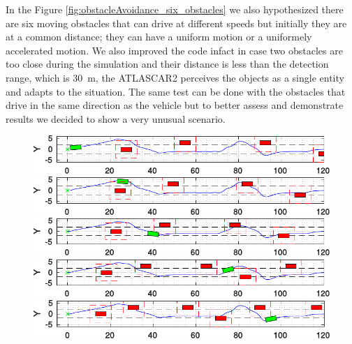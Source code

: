 In the Figure \ref{fig:obstacleAvoidance_six_obstacles} we also hypothesized there are six moving obstacles that can drive at different speeds but initially they are at a common distance; they can have a uniform motion or a uniformely accelerated motion. We also improved the code infact in case two obstacles are too close during the simulation and their distance is less than the detection range, which is \SI{30}{m}, the ATLASCAR2 perceives the objects as a single entity and adapts to the situation. The same test can be done with the obstacles that drive in the same direction as the vehicle but to better assess and demonstrate results we decided to show a very unusual scenario. 
\begin{figure}[h!]
	\centering
	\begin{minipage}[t]{\textwidth}
		\includegraphics[width=\textwidth]{../figure/6_obstacles/6_obstacles_1.pdf}
	\end{minipage}
	\begin{minipage}[t]{\textwidth}
		\includegraphics[width=\textwidth]{../figure/6_obstacles/6_obstacles_2.pdf}
	\end{minipage}
	\begin{minipage}[t]{\textwidth}
		\includegraphics[width=\textwidth]{../figure/6_obstacles/6_obstacles_3.pdf}
	\end{minipage}
	\begin{minipage}[t]{\textwidth}
		\includegraphics[width=\textwidth]{../figure/6_obstacles/6_obstacles_4.pdf}
	\end{minipage}
	\begin{minipage}[t]{\textwidth}
		\includegraphics[width=\textwidth]{../figure/6_obstacles/6_obstacles_5.pdf}

\end{minipage}
\end{figure}
